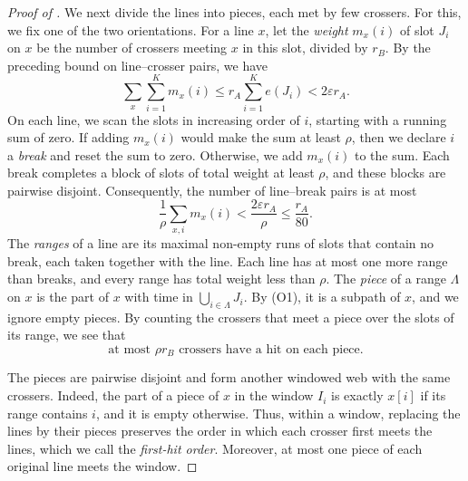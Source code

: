 \documentclass[fontsize=12pt,leading=14pt]{fullpaper}
\newcommand{\eps}{\varepsilon}
\begin{document}
\begin{proof}[Proof of ]
  We next divide the lines into pieces, each met by few crossers.
  For this, we fix one of the two orientations.
  For a line $x$, let the \emph{weight} $m_x(i)$ of slot $J_i$ on $x$ be the number of crossers meeting $x$ in this slot, divided by $r_B$.
  By the preceding bound on line--crosser pairs, we have
  \[
    \sum_x\sum_{i=1}^K m_x(i)\le r_A\sum_{i=1}^K e(J_i)<2\eps r_A.
  \]
  On each line, we scan the slots in increasing order of $i$, starting with a running sum of zero.
  If adding $m_x(i)$ would make the sum at least $\rho$, then we declare $i$ a \emph{break} and reset the sum to zero.
  Otherwise, we add $m_x(i)$ to the sum.
  Each break completes a block of slots of total weight at least $\rho$, and these blocks are pairwise disjoint.
  Consequently, the number of line--break pairs is at most
  \[
    \frac1\rho\sum_{x,i}m_x(i)<\frac{2\eps r_A}{\rho}\le\frac{r_A}{80}.
  \]
  The \emph{ranges} of a line are its maximal non-empty runs of slots that contain no break, each taken together with the line.
  Each line has at most one more range than breaks, and every range has total weight less than $\rho$.
  The \emph{piece} of a range $\Lambda$ on $x$ is the part of $x$ with time in $\bigcup_{i\in\Lambda}J_i$.
  By (O1), it is a subpath of $x$, and we ignore empty pieces.
  By counting the crossers that meet a piece over the slots of its range, we see that
  \begin{equation}\label{eq:dens-piece}
    \text{at most }\rho r_B\text{ crossers have a hit on each piece.}
  \end{equation}

  The pieces are pairwise disjoint and form another windowed web with the same crossers.
  Indeed, the part of a piece of $x$ in the window $I_i$ is exactly $x[i]$ if its range contains $i$, and it is empty otherwise.
  Thus, within a window, replacing the lines by their pieces preserves the order in which each crosser first meets the lines, which we call the \emph{first-hit order}.
  Moreover, at most one piece of each original line meets the window.


\end{proof}
\end{document}
